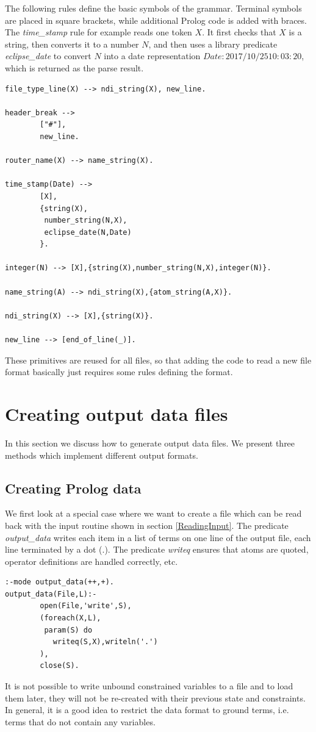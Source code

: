 \documentclass[a4paper,12pt]{report}
\begin{document}
The following rules define the basic symbols of the grammar. Terminal symbols are placed in square brackets, while additional Prolog code is added with braces. The {\it time\_stamp} rule for example reads one token $X$. It first checks that $X$ is a string, then converts it to a number $N$, and then uses a library predicate {\it eclipse\_date} to convert $N$ into a date representation $Date: 2017/10/25 10:03:20 $, which is returned as the parse result. 
\begin{verbatim}
file_type_line(X) --> ndi_string(X), new_line.

header_break --> 
        ["#"],
        new_line.

router_name(X) --> name_string(X).

time_stamp(Date) --> 
        [X],
        {string(X),
         number_string(N,X),
         eclipse_date(N,Date)
        }.

integer(N) --> [X],{string(X),number_string(N,X),integer(N)}.

name_string(A) --> ndi_string(X),{atom_string(A,X)}.

ndi_string(X) --> [X],{string(X)}.

new_line --> [end_of_line(_)].
\end{verbatim}
These primitives are reused for all files, so that adding the code to read a new file format basically just requires some rules defining the format. 

\section{Creating output data files}
In this section we discuss how to generate output data files. We present three methods which implement different output formats.

\subsection{Creating Prolog data}
We first look at a special case where we want to create a file which can be read back with the input routine shown in section \ref{ReadingInput}. The predicate {\it output\_data} writes each item in a list of terms on one line of the output file, each line terminated by a dot (.). The predicate {\it writeq} ensures that atoms are quoted, operator definitions are handled correctly, etc.
\begin{verbatim}
:-mode output_data(++,+).
output_data(File,L):-
        open(File,'write',S),
        (foreach(X,L),
         param(S) do
           writeq(S,X),writeln('.')
        ),
        close(S).
\end{verbatim}
It is not possible to write unbound constrained variables to a file and to load them later, they will not be re-created with their previous state and constraints. In general, it is a good idea to restrict the data format to ground terms, i.e. terms that do not contain any variables.
\end{document}
